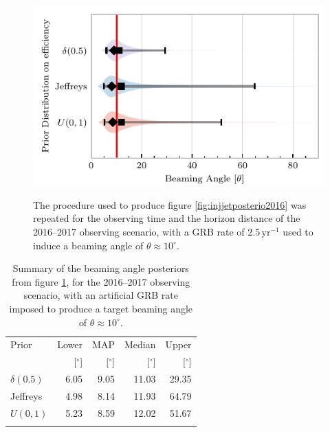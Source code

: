 \documentclass[twocolumn]{aastex61}
\newcommand{\yr}{\mathrm{yr}}
\begin{document}
\begin{figure}%
\centering
{\includegraphics[width=\linewidth]{O2_injections_violin.pdf}}
\caption{The procedure used to produce figure \ref{fig:injjetposterio2016} was repeated for the observing time and the horizon distance of the 2016--2017 observing scenario, with a GRB rate of $2.5 \,\yr^{-1}$ used to induce a beaming angle of $\theta \approx 10^{\circ}$.
  \label{fig:injjetposterio2017}}
\end{figure}
\begin{table}
  \centering
  \begin{tabular}{lrrrr}
    \toprule
    Prior & Lower & MAP & Median & Upper\\
          & [$^\circ$] & [$^\circ$]& [$^\circ$]& [$^\circ$] \\
    \colrule
    
    $\delta(0.5)$ & 6.05	 & 9.05	 & 11.03	 & 29.35	 \\
    Jeffreys & 4.98	 & 8.14	 & 11.93	 & 64.79	 \\
    $U(0,1)$ & 5.23	 & 8.59	 & 12.02	 & 51.67	 \\
\botrule
\end{tabular}
\caption{Summary of the beaming angle posteriors from figure
  \ref{fig:injjetposterio2017}, for the 2016--2017 observing scenario,
  with an artificial GRB rate imposed to produce a target beaming
  angle of $\theta \approx 10^{\circ}$.}
  \label{tab:summaryinj2016}
\end{table}
\end{document}
